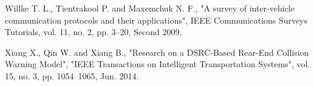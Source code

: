 \begin{thebibliography}{}
\newblock Willke T. L., Tientrakool P. and Maxemchuk N. F., 
\newblock "A survey of inter-vehicle communication protocols and their applications",
\newblock IEEE Communications Surveys Tutorials, vol. 11, no. 2, pp. 3–20, Second 2009.

\newblock Xiang X., Qin W. and Xiang B., 
\newblock "Research on a DSRC-Based Rear-End Collision Warning Model",
\newblock "IEEE Transactions on Intelligent Transportation Systems", vol. 15, no. 3, pp. 1054–1065, Jun. 2014.


\end{thebibliography}
